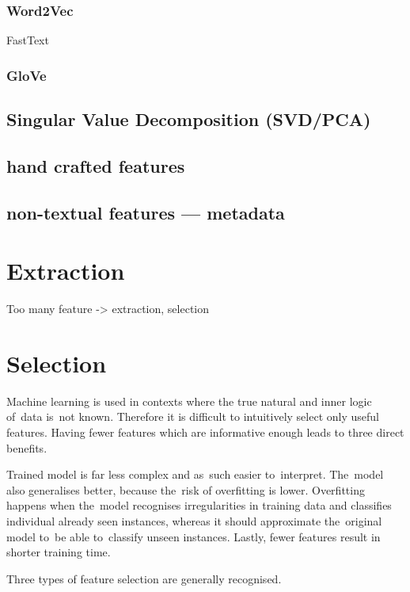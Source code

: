 \subsubsection{Word2Vec}

FastText

\subsubsection{GloVe}


\subsection{Singular Value Decomposition (SVD/PCA)}

\subsection{hand crafted features}

\subsection{non-textual features --- metadata}



\section{Extraction}

Too many feature -> extraction, selection



\section{Selection}

Machine learning is used in contexts where the true natural and inner logic of~data is~not known. Therefore it is difficult to intuitively select only useful features. Having fewer features which are informative enough leads to three direct benefits.

Trained model is far less complex and as~such easier to~interpret. The~model also generalises better, because the~risk of overfitting is lower. Overfitting happens when the~model recognises irregularities in training data and classifies individual already seen instances, whereas it should approximate the~original model to~be able to~classify unseen instances. Lastly, fewer features result in shorter training time.

Three types of feature selection are generally recognised.




